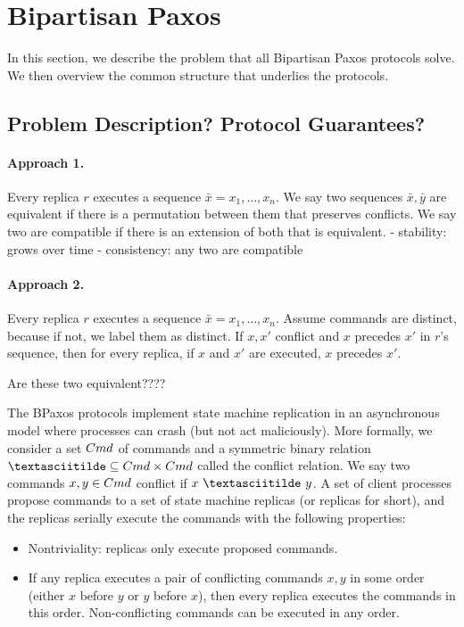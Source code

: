 \section{Bipartisan Paxos}
In this section, we describe the problem that all Bipartisan Paxos protocols
solve. We then overview the common structure that underlies the protocols.

\subsection{Problem Description? Protocol Guarantees?}

\paragraph{Approach 1.}
Every replica $r$ executes a sequence $\bar{x} = x_1, \ldots, x_n$. We say two
sequences $\bar{x}, \bar{y}$ are equivalent if there is a permutation between
them that preserves conflicts. We say two are compatible if there is an
extension of both that is equivalent.
  - stability: grows over time
  - consistency: any two are compatible


\paragraph{Approach 2.}
Every replica $r$ executes a sequence $\bar{x} = x_1, \ldots, x_n$. Assume
commands are distinct, because if not, we label them as distinct. If $x, x'$ conflict and $x$ precedes $x'$ in $r$'s sequence, then for every replica, if $x$ and $x'$ are executed, $x$ precedes $x'$.

Are these two equivalent????

The BPaxos protocols implement state machine replication in an asynchronous model where processes can crash (but not act maliciously). More formally, we consider a set $Cmd$ of commands and a symmetric binary relation $\conflict \subseteq \Cmd \times \Cmd$ called the conflict relation. We say two commands $x, y \in Cmd$ conflict if $x \conflicts y$. A set of client processes propose commands to a set of state machine replicas (or replicas for short), and the replicas serially execute the commands with the following properties:

\begin{itemize}
  \item Nontriviality: replicas only execute proposed commands.
  \item If any replica executes a pair of conflicting commands $x, y$ in some order (either $x$ before $y$ or $y$ before $x$), then every replica executes the commands in this order. Non-conflicting commands can be executed in any order.
\end{itemize}

